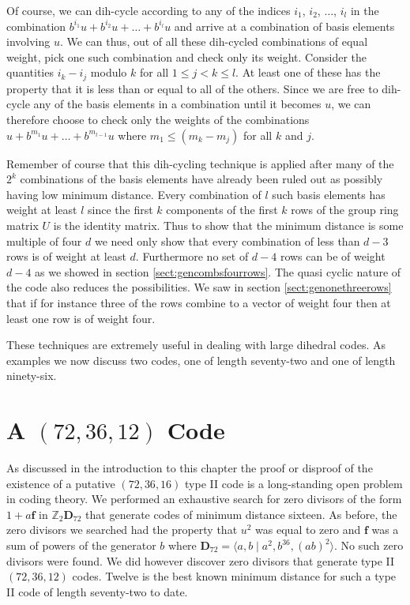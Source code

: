 Of course, we can dih-cycle according to any of the indices $i_1$, $i_2$, $\ldots$, $i_l$ in the combination $b^{i_1} u + b^{i_2} u + \ldots + b^{i_l} u$ and arrive at a combination of basis elements involving $u$.
We can thus, out of all these dih-cycled combinations of equal weight, pick one such combination and check only its weight.
Consider the quantities $i_k - i_j$ modulo $k$ for all $1 \leq j < k \leq l$.
At least one of these has the property that it is less than or equal to all of the others.
Since we are free to dih-cycle any of the basis elements in a combination until it becomes $u$, we can therefore choose to check only the weights of the combinations $u + b^{m_1} u + \ldots + b^{m_{l-1}} u $ where $m_1 \leq ( m_k - m_j )$ for all $k$ and $j$.

Remember of course that this dih-cycling technique is applied after many of the $2^k$ combinations of the basis elements have already been ruled out as possibly having low minimum distance.
Every combination of $l$ such basis elements has weight at least $l$ since the first $k$ components of the first $k$ rows of the group ring matrix $U$ is the identity matrix.
Thus to show that the minimum distance is some multiple of four $d$ we need only show that every combination of less than $d-3$ rows is of weight at least $d$.
Furthermore no set of $d-4$ rows can be of weight $d-4$ as we showed in section \ref{sect:gencombsfourrows}.
The quasi cyclic nature of the code also reduces the possibilities.
We saw in section \ref{sect:genonethreerows} that if for instance three of the rows combine to a vector of weight four then at least one row is of weight four.

These techniques are extremely useful in dealing with large dihedral codes.
As examples we now discuss two codes, one of length seventy-two and one of length ninety-six.

\section{A $(72,36,12)$ Code}
\label{sect:gen723612}
As discussed in the introduction to this chapter the proof or disproof of the existence of a putative $(72,36,16)$ type II code is a long-standing open problem in coding theory.
We performed an exhaustive search for zero divisors of the form $1 + a \mathbf{f}$ in $\mathbb{Z}_2 \mathbf{D}_{72}$ that generate codes of minimum distance sixteen.
As before, the zero divisors we searched had the property that $u^2$ was equal to zero and $\mathbf{f}$ was a sum of powers of the generator $b$ where $\mathbf{D}_{72} = \langle a , b \mid a^2 , b^{36} , (ab)^2 \rangle $.
No such zero divisors were found.
We did however discover zero divisors that generate type II $(72,36,12)$ codes.
Twelve is the best known minimum distance for such a type II code of length seventy-two to date.

